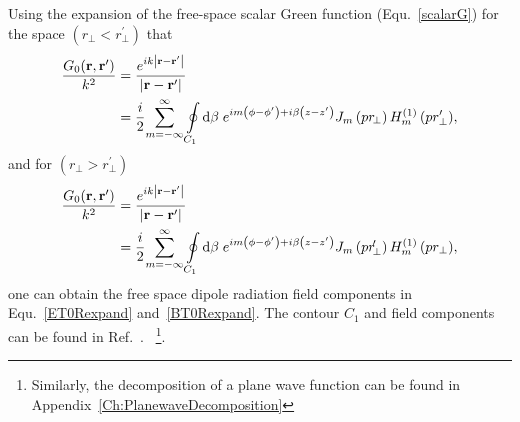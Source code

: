 Using the expansion of the free-space scalar Green function (Equ.~\eqref{scalarG}) for the space $ \left(r\!_\perp <r_\perp ^{\prime}\right) $ that 
\begin{align}
\frac{G_0(\br,\br')}{k^2} &={\frac{{e^{ik{\left| {{\rm {\bf r}}-{\rm {\bf {r}^{\prime }}}}\right| }}}}{{{%
\left| {{\rm {\bf r}}-{\rm {\bf {r}^{\prime }}}}\right| }}}}\nonumber\\
&={\frac{{i}}{{2}}%
}{\sum\limits_{m=-\infty }^{\infty } {{\oint\limits_{C_{1}}{\mathrm{d}\beta \;e^{im\left( {\phi -{\phi }%
^{\prime }}\right) +i\beta \left( {z-{z}^{\prime }}\right) }J_{m}\left( {pr\!_\perp
}\right) H_{m}^{\left( {1}\right) }\left( pr_\perp ^{\prime
}\right) }}}},
\end{align}
and for $ \left(r\!_\perp >r_\perp ^{\prime}\right) $
\begin{align}
\frac{G_0(\br,\br')}{k^2} &={\frac{{e^{ik{\left| {{\rm {\bf r}}-{\rm {\bf {r}^{\prime }}}}\right| }}}}{{{%
\left| {{\rm {\bf r}}-{\rm {\bf {r}^{\prime }}}}\right| }}}}\nonumber\\
&={\frac{{i}}{{2}}%
}{\sum\limits_{m=-\infty }^{\infty } {{\oint\limits_{C_{1}}{\mathrm{d}\beta \;e^{im\left( {\phi -{\phi }%
^{\prime }}\right) +i\beta \left( {z-{z}^{\prime }}\right) }J_{m}\left( {pr\!_\perp^{\prime} }\right) H_{m}^{\left( {1}\right) }\left( pr_\perp \right) }}}},
\end{align}
one can obtain the free space dipole radiation field components in Equ.~\eqref{ET0Rexpand} and~\eqref{BT0Rexpand}. The contour $ C_1 $ and field components can be found in Ref.~\cite{Klimov2004}. ~\footnote{Similarly, the decomposition of a plane wave function can be found in Appendix~\ref{Ch:PlanewaveDecomposition}}.

